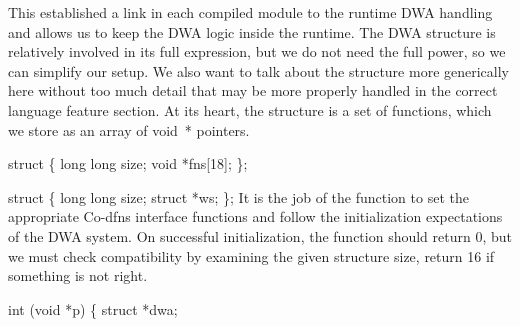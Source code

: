 \documentclass{article}%
\begin{document}
This established a link in each compiled module
to the runtime DWA handling and allows us
to keep the DWA logic inside the runtime.
The DWA structure is relatively involved 
in its full expression,
but we do not need the full power,
so we can simplify our setup.
We also want to talk about the structure
more generically here without too much detail
that may be more properly handled in the correct 
language feature section.
At its heart, the structure is a set of functions,
which we store as an array of {\Tt{}void\ *\nwendquote} pointers.

\nwenddocs{}\plusendmoddef\nwstartdeflinemarkup{}\nwenddeflinemarkup
struct  \{
        long long size;
        void *fns[18];
\};

struct  \{
        long long size;
        struct  *ws;
\};
\eatline
{}\nwendcode{}\nwdocspar
It is the job of the {\Tt{}\nwendquote} function
to set the appropriate Co-dfns interface functions
and follow the initialization expectations
of the DWA system.
On successful initialization,
the function should return 0,
but we must check compatibility by examining the given structure {\Tt{}size\nwendquote},
return {\Tt{}16\nwendquote} if something is not right.

\nwenddocs{}\plusendmoddef\nwstartdeflinemarkup{}\nwenddeflinemarkup
{} int
(void *p)
\{
        struct  *dwa;
\end{document}
